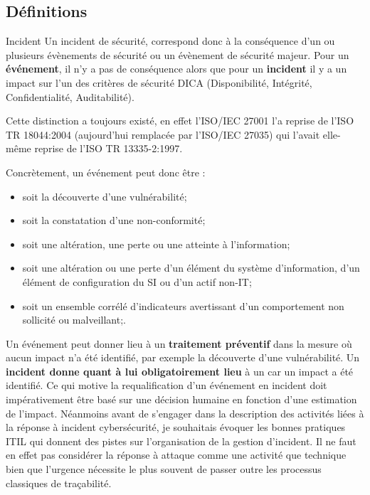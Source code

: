 \subsection{Définitions}

\begin{notebox}{Incident}
Un incident de sécurité, correspond donc à la conséquence d’un ou plusieurs évènements de sécurité ou un évènement de sécurité majeur. Pour un \textbf{événement}, il n'y a pas de conséquence alors que pour un \textbf{incident} il y a un impact sur l’un des critères de sécurité DICA (Disponibilité, Intégrité, Confidentialité, Auditabilité).
\end{notebox}

Cette distinction a toujours existé, en effet l'ISO/IEC 27001 l'a reprise de l'ISO TR 18044:2004 (aujourd'hui remplacée par l'ISO/IEC 27035) qui l'avait elle-même reprise de l'ISO TR 13335-2:1997. 

Concrètement, un événement peut donc être :

\begin{itemize}
  \item soit la découverte d’une vulnérabilité;
  \item  soit la constatation d’une non-conformité;
  \item soit une altération, une perte ou une atteinte à l’information;
  \item   soit une altération ou une perte d’un élément du système d’information, d’un élément de configuration du SI ou d’un actif non-IT;
  \item  soit un ensemble corrélé d'indicateurs avertissant d'un comportement non sollicité ou malveillant;.
\end{itemize}

Un événement peut donner lieu à un \textbf{traitement préventif} dans la mesure où aucun impact n'a été identifié, par exemple la découverte d’une vulnérabilité.
Un \textbf{incident donne quant à lui obligatoirement lieu} à un  car un impact a été identifié.
Ce qui motive la requalification d’un événement en incident doit impérativement être basé sur une décision humaine en fonction d'une estimation de l'impact.
Néanmoins avant de s'engager dans la description des activités liées à la réponse à incident cybersécurité, je souhaitais évoquer les bonnes pratiques ITIL qui donnent des pistes sur l'organisation de la gestion d'incident. Il ne faut en effet pas considérer la réponse à attaque comme une activité que technique bien que l'urgence nécessite le plus souvent de passer outre les processus classiques de traçabilité.


